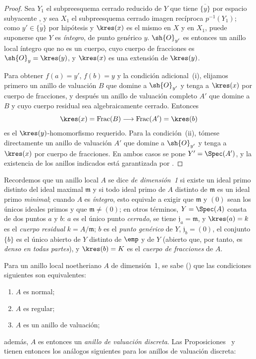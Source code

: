 \documentclass[oneside,10pt]{amsart}
\def\Frac{\operatorname{Frac}}
\newcommand{\oldpage}[2][]{\marginnote{\normalfont\footnotesize\textbf{#1}~|~#2}\ignorespaces}
\let\EGAOriginalLabel\label
\renewcommand{\label}[1]{\phantomsection\EGAOriginalLabel{#1}}
\begin{document}
\begin{proof}
Sea $Y_1$ el subpreesquema cerrado reducido de $Y$ que tiene $\overline{\{y\}}$ por espacio subyacente , y sea $X_1$ el subpreesquema cerrado imagen recíproca $p^{-1}(Y_1)$;
como $y'\in\overline{\{y\}}$ por hipótesis y $\kres(x)$ es el mismo en $X$ y en $X_1$, puede suponerse que $Y$ es \emph{íntegro}, de punto genérico $y$.
$\sh{O}_{y'}$ es entonces un anillo local íntegro que no es un cuerpo, cuyo cuerpo de fracciones es $\sh{O}_y=\kres(y)$, y $\kres(x)$ es una extensión de $\kres(y)$.

Para obtener $f(a)=y'$, $f(b)=y$ y la condición adicional~(i), elijamos primero un anillo de valuación $B$ que domine a $\sh{O}_{y'}$ y tenga a $\kres(x)$ por cuerpo de fracciones, y después un anillo de valuación completo $A'$ que domine a $B$ y cuyo cuerpo residual sea algebraicamente cerrado.
Entonces
\[
  \kres(x)=\Frac(B)\longrightarrow\Frac(A')=\kres(b)
\]
es el $\kres(y)$-homomorfismo requerido.
Para la condición~(ii), tómese directamente un anillo de valuación $A'$ que domine a $\sh{O}_{y'}$ y tenga a $\kres(x)$ por cuerpo de fracciones.
En ambos casos se pone $Y'=\Spec(A')$, y la existencia de los anillos indicados está garantizada por .
\end{proof}

\begin{env}[7.1.5]
\label{II.7.1.5}
Recordemos que un anillo local $A$ se dice \emph{de dimensión~1} si existe un ideal primo distinto del ideal maximal $\mathfrak{m}$ y si todo ideal primo de $A$ distinto de $\mathfrak{m}$ es un ideal primo \emph{minimal};
cuando $A$ es \emph{íntegro}, esto equivale a exigir que $\mathfrak{m}$ y $(0)$ sean los únicos ideales primos y que $\mathfrak{m}\neq(0)$;
en otros términos, $Y=\Spec(A)$ consta de dos
\oldpage[II]{140}
puntos $a$ y $b$: $a$ es el único punto \emph{cerrado}, se tiene $\mathfrak{j}_a=\mathfrak{m}$, y $\kres(a)=k$ es el \emph{cuerpo residual} $k=A/\mathfrak{m}$;
$b$ es el \emph{punto genérico} de $Y$, $\mathfrak{j}_b=(0)$, el conjunto $\{b\}$ es el único abierto de $Y$ distinto de $\emp$ y de $Y$ (abierto que, por tanto, es \emph{denso en todas partes}), y $\kres(b)=K$ es el \emph{cuerpo de fracciones} de $A$.
\end{env}

\begin{env}[7.1.6]
\label{II.7.1.6}
Para un anillo local noetheriano $A$ de dimensión~1, se sabe (\cite[pp.~2-08 y 17-01]{I-1}) que las condiciones siguientes son equivalentes:
\begin{enumerate}
  \item[\rm{(a)}] $A$ es normal;
  \item[\rm{(b)}] $A$ es regular;
  \item[\rm{(c)}] $A$ es un anillo de valuación;
\end{enumerate}
además, $A$ es entonces un \emph{anillo de valuación discreta}.
Las Proposiciones~ y  tienen entonces los análogos siguientes para los anillos de valuación discreta:
\end{env}
\end{document}
